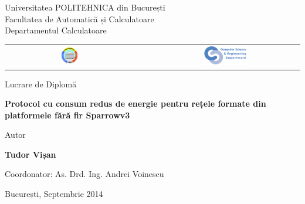 


\pagestyle{empty}
\sffamily

\noindent
\begin{center}
	\Large
	Universitatea POLITEHNICA din București\\
	Facultatea de Automatică și Calculatoare\\
	Departamentul Calculatoare\\
	\begin{table}[h]
		\begin{center}
			\begin{tabular}{cccc}
				\includegraphics[width=0.13\textwidth]
				{img/upb.png}
				& & &
				\includegraphics[width=0.30\textwidth]
				{img/cs.png}
			\end{tabular}
		\end{center}
	\end{table}
\end{center}

\vfill\vfill
\begin{center}
	\Large
	Lucrare de Diplomă\\
\end{center}

\vfill
\begin{center}
	\HUGE\bfseries
	Protocol cu consum redus de energie pentru rețele formate din
	platformele fără fir Sparrowv3\\
	\vfill
	\large
\end{center}

\vfill
\begin{center}
	\Large
	Autor
\end{center}

\begin{center}
	\huge\bfseries
	Tudor Vișan
\end{center}

\vfill\vfill\vfill
\begin{center}
	\Large
	Coordonator: As. Drd. Ing. Andrei Voinescu\\
\end{center}

\vfill
\begin{center}
	\large
	București, Septembrie 2014
\end{center}

\cleardoublepage

